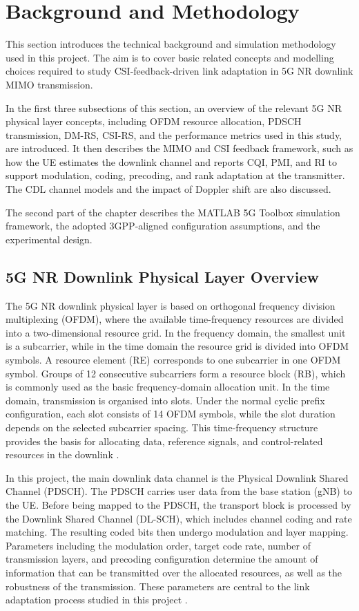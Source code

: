 \documentclass[a4paper,12pt,onecolumn]{article}
\begin{document}
\section{Background and Methodology}
\label{sec:2}

	This section introduces the technical background and simulation methodology used in this project. The aim is to cover basic related concepts and modelling choices required to study CSI-feedback-driven link adaptation in 5G NR downlink MIMO transmission. 
	
	In the first three subsections of this section, an overview of the relevant 5G NR physical layer concepts, including OFDM resource allocation, PDSCH transmission, DM-RS, CSI-RS, and the performance metrics used in this study, are introduced. It then describes the MIMO and CSI feedback framework, such as how the UE estimates the downlink channel and reports CQI, PMI, and RI to support modulation, coding, precoding, and rank adaptation at the transmitter. The CDL channel models and the impact of Doppler shift are also discussed.
	
	The second part of the chapter describes the MATLAB 5G Toolbox simulation framework, the adopted 3GPP-aligned configuration assumptions, and the experimental design.


\subsection{5G NR Downlink Physical Layer Overview}
\label{sec:2.1}
	The 5G NR downlink physical layer is based on orthogonal frequency division
	multiplexing (OFDM), where the available time-frequency resources are divided into
	a two-dimensional resource grid. In the frequency domain, the smallest unit is a
	subcarrier, while in the time domain the resource grid is divided into OFDM symbols. A resource element (RE) corresponds to one subcarrier in one OFDM symbol. Groups of 12 consecutive subcarriers form a resource block (RB), which is commonly used as the basic frequency-domain allocation unit. In the time domain, transmission is organised into slots. Under the normal cyclic prefix configuration, each slot consists of 14 OFDM symbols, while the slot duration depends on the selected subcarrier spacing. This time-frequency structure provides the basis for allocating data, reference signals, and control-related resources in the downlink \cite[Ch.~7]{EricssonBook}. 

	In this project, the main downlink data channel is the Physical Downlink Shared Channel (PDSCH). The PDSCH carries user data from the base station (gNB) to the UE. Before being mapped to the PDSCH, the transport block is processed by the Downlink Shared Channel (DL-SCH), which includes channel coding and rate matching. The resulting coded bits then undergo modulation and layer mapping. Parameters including the modulation order, target code rate, number of transmission layers, and precoding configuration determine the amount of information that can be transmitted over the allocated resources, as well as the robustness of the transmission. These parameters are central to the link adaptation process studied in this project \cite[Ch.~7]{EricssonBook}.
\end{document}
